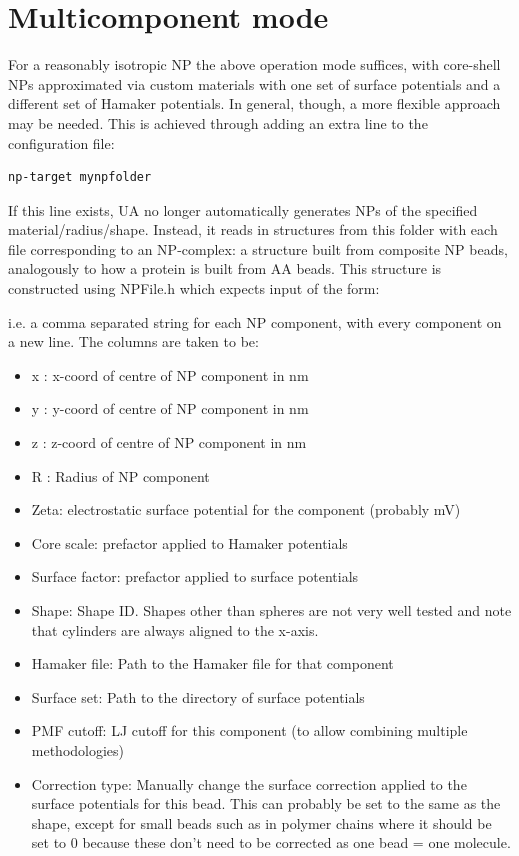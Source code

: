\documentclass[10pt,a4paper,onecolumn]{report}
\begin{document}
\section{Multicomponent mode}
For a reasonably isotropic NP the above operation mode suffices, with core-shell NPs approximated via custom materials with one set of surface potentials and a different set of Hamaker potentials. In general, though, a more flexible approach may be needed. This is achieved through adding an extra line to the configuration file:
\begin{lstlisting}
np-target mynpfolder
\end{lstlisting}
If this line exists, UA no longer automatically generates NPs of the specified material/radius/shape. Instead, it reads in structures from this folder with each file corresponding to an NP-complex: a structure built from composite NP beads, analogously to how a protein is built from AA beads. This structure is constructed using NPFile.h which expects input of the form:

i.e. a comma separated string for each NP component, with every component on a new line. The columns are taken to be:
\begin{itemize}
\item x : x-coord of centre of NP component in nm
\item y : y-coord of centre of NP component in nm
\item z : z-coord of centre of NP component in nm
\item R : Radius of NP component
\item Zeta: electrostatic surface potential for the component (probably mV)
\item Core scale: prefactor applied to Hamaker potentials
\item Surface factor: prefactor applied to surface potentials
\item Shape: Shape ID. Shapes other than spheres are not very well tested and note that cylinders are always aligned to the x-axis.
\item Hamaker file: Path to the Hamaker file for that component
\item Surface set: Path to the directory of surface potentials
\item PMF cutoff: LJ cutoff for this component (to allow combining multiple methodologies)
\item Correction type: Manually change the surface correction applied to the surface potentials for this bead. This can probably be set to the same as the shape, except for small beads such as in polymer chains where it should be set to 0 because these don't need to be corrected as one bead = one molecule.
\end{itemize}
\end{document}
